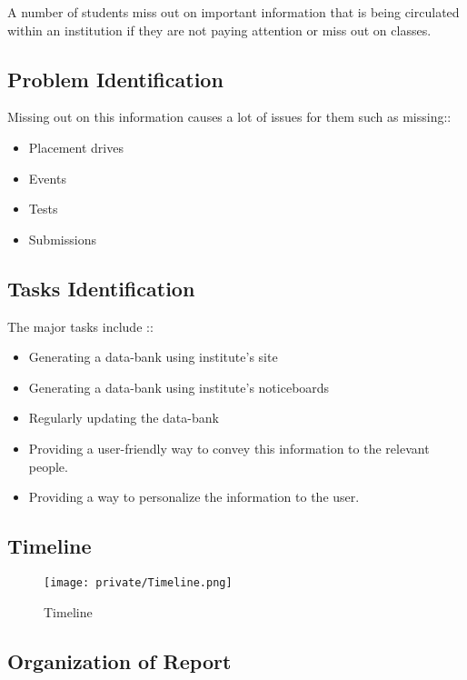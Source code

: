 \documentclass[14pt]{extarticle}
\begin{document}
A number of students miss out on important information that is being circulated within an institution if they are not paying attention or miss out on classes.

\subsection{Problem Identification}

Missing out on this information causes a lot of issues for them such as missing:: \\
\vspace*{-3em}
\begin{itemize}
    \item Placement drives
    \item Events
    \item Tests
    \item Submissions
\end{itemize}

\subsection{Tasks Identification}

The major tasks include ::
\vspace*{-1.5em}
\begin{itemize}
    \item Generating a data-bank using institute's site
    \item Generating a data-bank using institute's noticeboards
    \item Regularly updating the data-bank
    \item Providing a user-friendly way to convey this information to the relevant people.
    \item Providing a way to personalize the information to the user.
\end{itemize}

\subsection{Timeline}

\begin{figure}[!htb]
    \begin{center}
        \texttt{[image: private/Timeline.png]}
    \end{center}
    \caption{Timeline}
\end{figure}

\subsection{Organization of Report}
\end{document}

